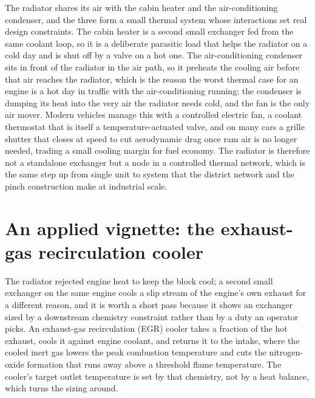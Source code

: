 

\begin{mastery}
The radiator shares its air with the cabin heater and the air-conditioning
condenser, and the three form a small thermal system whose interactions set real
design constraints. The cabin heater is a second small exchanger fed from the same
coolant loop, so it is a deliberate parasitic load that helps the radiator on a
cold day and is shut off by a valve on a hot one. The air-conditioning condenser
sits in front of the radiator in the air path, so it preheats the cooling air
before that air reaches the radiator, which is the reason the worst thermal case
for an engine is a hot day in traffic with the air-conditioning running: the
condenser is dumping its heat into the very air the radiator needs cold, and the
fan is the only air mover. Modern vehicles manage this with a controlled electric
fan, a coolant thermostat that is itself a temperature-actuated valve, and on
many cars a grille shutter that closes at speed to cut aerodynamic drag once ram
air is no longer needed, trading a small cooling margin for fuel economy. The
radiator is therefore not a standalone exchanger but a node in a controlled thermal
network, which is the same step up from single unit to system that the district
network and the pinch construction make at industrial scale.
\end{mastery}

\section{An applied vignette: the exhaust-gas recirculation cooler}

The radiator rejected engine heat to keep the block cool; a second small exchanger
on the same engine cools a slip stream of the engine's own exhaust for a different
reason, and it is worth a short pass because it shows an exchanger sized by a
downstream chemistry constraint rather than by a duty an operator picks. An
exhaust-gas recirculation (EGR) cooler takes a fraction of the hot exhaust,
cools it against engine coolant, and returns it to the intake, where the cooled
inert gas lowers the peak combustion temperature and cuts the nitrogen-oxide
formation that runs away above a threshold flame temperature. The cooler's target
outlet temperature is set by that chemistry, not by a heat balance, which turns the
sizing around.

